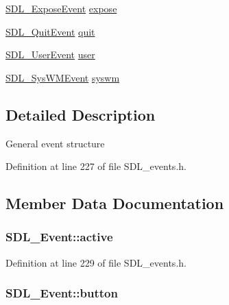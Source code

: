 \begin{DoxyCompactItemize}
\item 
\hyperlink{struct_s_d_l___expose_event}{S\+D\+L\+\_\+\+Expose\+Event} \hyperlink{union_s_d_l___event_ae70b3cbeb6e05e3e1322a906c9fbe7d5}{expose}
\item 
\hyperlink{struct_s_d_l___quit_event}{S\+D\+L\+\_\+\+Quit\+Event} \hyperlink{union_s_d_l___event_a102a3008afe67a1c02ae7504e232dcef}{quit}
\item 
\hyperlink{struct_s_d_l___user_event}{S\+D\+L\+\_\+\+User\+Event} \hyperlink{union_s_d_l___event_ab7c394e3ce7bf1e4f8d68bc0e9f1b042}{user}
\item 
\hyperlink{struct_s_d_l___sys_w_m_event}{S\+D\+L\+\_\+\+Sys\+W\+M\+Event} \hyperlink{union_s_d_l___event_ab3b2eaf5348d4c50a51b1f297fdef537}{syswm}
\end{DoxyCompactItemize}


\subsection{Detailed Description}
General event structure 

Definition at line 227 of file S\+D\+L\+\_\+events.\+h.



\subsection{Member Data Documentation}
\hypertarget{union_s_d_l___event_ab8b2b899275fb4116ec85ae5a926b23d}{}
\subsubsection[{active}]{ S\+D\+L\+\_\+\+Event\+::active}\label{union_s_d_l___event_ab8b2b899275fb4116ec85ae5a926b23d}


Definition at line 229 of file S\+D\+L\+\_\+events.\+h.

\hypertarget{union_s_d_l___event_ab6da2fa2687e5f849f270adecc64785f}{}
\subsubsection[{button}]{ S\+D\+L\+\_\+\+Event\+::button}\label{union_s_d_l___event_ab6da2fa2687e5f849f270adecc64785f}


